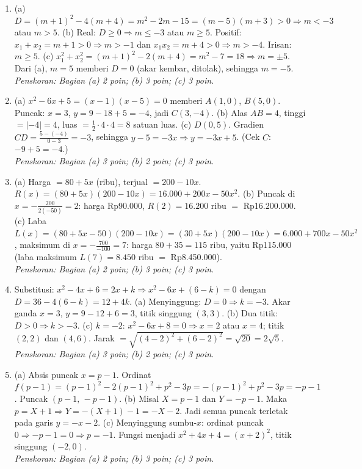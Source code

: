 \documentclass[a4paper,11pt]{article}
\newcommand{\dis}{\displaystyle}
\begin{document}
\small\begin{enumerate}[leftmargin=2em,itemsep=3pt,topsep=2pt]
\item[\textbf{1.}] (a) $D=(m+1)^{2}-4(m+4)=m^{2}-2m-15=(m-5)(m+3)>0\Rightarrow m<-3$ atau $m>5$. (b) Real: $D\ge0\Rightarrow m\le-3$ atau $m\ge5$. Positif: $x_1+x_2=m+1>0\Rightarrow m>-1$ dan $x_1x_2=m+4>0\Rightarrow m>-4$. Irisan: $m\ge5$. (c) $x_1^2+x_2^2=(m+1)^2-2(m+4)=m^2-7=18\Rightarrow m=\pm5$. Dari (a), $m=5$ memberi $D=0$ (akar kembar, ditolak), sehingga $m=-5$. \\ \textit{Penskoran: Bagian (a) 2 poin; (b) 3 poin; (c) 3 poin.}
\item[\textbf{2.}] (a) $x^{2}-6x+5=(x-1)(x-5)=0$ memberi $A(1,0)$, $B(5,0)$. Puncak: $x=3$, $y=9-18+5=-4$, jadi $C(3,-4)$. (b) Alas $AB=4$, tinggi $=|-4|=4$, luas $=\dis\frac12\cdot4\cdot4=8$ satuan luas. (c) $D(0,5)$. Gradien $CD=\dis\frac{5-(-4)}{0-3}=-3$, sehingga $y-5=-3x\Rightarrow y=-3x+5$. (Cek $C$: $-9+5=-4$.) \\ \textit{Penskoran: Bagian (a) 3 poin; (b) 2 poin; (c) 3 poin.}
\item[\textbf{3.}] (a) Harga $=80+5x$ (ribu), terjual $=200-10x$. $R(x)=(80+5x)(200-10x)=16.000+200x-50x^{2}$. (b) Puncak di $x=-\dis\frac{200}{2(-50)}=2$: harga Rp90.000, $R(2)=16.200$ ribu $=$ Rp16.200.000. (c) Laba $L(x)=(80+5x-50)(200-10x)=(30+5x)(200-10x)=6.000+700x-50x^{2}$, maksimum di $x=-\dis\frac{700}{-100}=7$: harga $80+35=115$ ribu, yaitu Rp115.000 (laba maksimum $L(7)=8.450$ ribu $=$ Rp8.450.000). \\ \textit{Penskoran: Bagian (a) 2 poin; (b) 3 poin; (c) 3 poin.}
\item[\textbf{4.}] Substitusi: $x^{2}-4x+6=2x+k\Rightarrow x^{2}-6x+(6-k)=0$ dengan $D=36-4(6-k)=12+4k$. (a) Menyinggung: $D=0\Rightarrow k=-3$. Akar ganda $x=3$, $y=9-12+6=3$, titik singgung $(3,3)$. (b) Dua titik: $D>0\Rightarrow k>-3$. (c) $k=-2$: $x^{2}-6x+8=0\Rightarrow x=2$ atau $x=4$; titik $(2,2)$ dan $(4,6)$. Jarak $=\sqrt{(4-2)^{2}+(6-2)^{2}}=\sqrt{20}=2\sqrt5$. \\ \textit{Penskoran: Bagian (a) 3 poin; (b) 2 poin; (c) 3 poin.}
\item[\textbf{5.}] (a) Absis puncak $x=p-1$. Ordinat $f(p-1)=(p-1)^{2}-2(p-1)^{2}+p^{2}-3p=-(p-1)^{2}+p^{2}-3p=-p-1$. Puncak $(p-1,\,-p-1)$. (b) Misal $X=p-1$ dan $Y=-p-1$. Maka $p=X+1\Rightarrow Y=-(X+1)-1=-X-2$. Jadi semua puncak terletak pada garis $y=-x-2$. (c) Menyinggung sumbu-$x$: ordinat puncak $0\Rightarrow-p-1=0\Rightarrow p=-1$. Fungsi menjadi $x^{2}+4x+4=(x+2)^{2}$, titik singgung $(-2,0)$. \\ \textit{Penskoran: Bagian (a) 2 poin; (b) 3 poin; (c) 3 poin.}
\end{enumerate}
\end{document}
